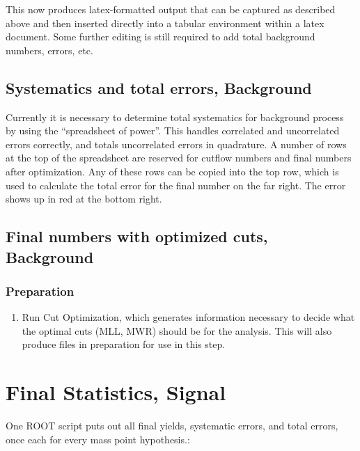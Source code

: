 \documentclass[english]{article}
\begin{document}
This now produces latex-formatted output that can be captured as
described above and then inserted directly into a tabular environment
within a latex document. Some further editing is still required to
add total background numbers, errors, etc.

\subsection{Systematics and total errors, Background}

Currently it is necessary to determine total systematics
for background process by using the ``spreadsheet of power''.
This handles correlated and uncorrelated errors correctly,
and totals uncorrelated errors in quadrature. A number of
rows at the top of the spreadsheet are reserved for cutflow
numbers and final numbers after optimization. Any of these
rows can be copied into the top row, which is used to calculate
the total error for the final number on the far right. The
error shows up in red at the bottom right.

\subsection{Final numbers with optimized cuts, Background}

\subsubsection{Preparation}
%
\begin{enumerate}
\item Run Cut Optimization, which generates information necessary to
decide what the optimal cuts (MLL, MWR) should be for the analysis.
This will also produce files in preparation for use in this step.
\end{enumerate}

\section{Final Statistics, Signal}

One ROOT script puts out all final yields, systematic errors, and total
errors, once each for every mass point hypothesis.:
\end{document}
